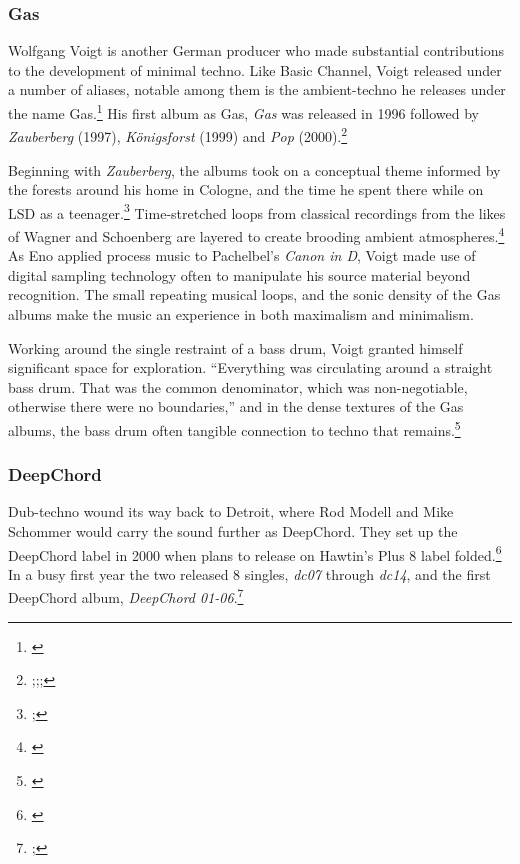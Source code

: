 \documentclass[12pt,twoside]{reedthesis}
\begin{document}
\subsubsection{Gas}
Wolfgang Voigt is another German producer who made substantial contributions to the development of minimal techno. Like Basic Channel, Voigt released under a number of aliases, notable among them is the ambient-techno he releases under the name Gas.\footnote{\cite{bacherWolfgangVoigt2018}} His first album as Gas, \emph{Gas} was released in 1996 followed by \emph{Zauberberg} (1997), \emph{K{\"o}nigsforst} (1999) and \emph{Pop} (2000).\footnote{\cite{gasGas1996};\cite{gasZauberberg1997};\cite{gasKonigsforst1999};\cite{gasPop2000}}

Beginning with \emph{Zauberberg}, the albums took on a conceptual theme informed by the forests around his home in Cologne, and the time he spent there while on LSD as a teenager.\footnote{\cite{mattfulkersonInterviewWolfgangVoigt2016};\cite{betaGasAmbientTechno2018}} Time-stretched loops from classical recordings from the likes of Wagner and Schoenberg are layered to create brooding ambient atmospheres.\footnote{\cite{betaGasAmbientTechno2018}} As Eno applied process music to Pachelbel's \emph{Canon in D}, Voigt made use of digital sampling technology often to manipulate his source material beyond recognition. The small repeating musical loops, and the sonic density of the Gas albums make the music an experience in both maximalism and minimalism.

Working around the single restraint of a bass drum, Voigt granted himself significant space for exploration. ``Everything was circulating around a straight bass drum. That was the common denominator, which was non-negotiable, otherwise there were no boundaries,'' and in the dense textures of the Gas albums, the bass drum often tangible connection to techno that remains.\footnote{\cite{bacherWolfgangVoigt2018}}

\subsubsection{DeepChord}
Dub-techno wound its way back to Detroit, where Rod Modell and Mike Schommer would carry the sound further as DeepChord. They set up the DeepChord label in 2000 when plans to release on Hawtin's Plus 8 label folded.\footnote{\cite{russellDeepChordDoesnCare2014}} In a busy first year the two released 8 singles, \emph{dc07} through \emph{dc14}, and the first DeepChord album, \emph{DeepChord 01-06}.\footnote{\cite{DeepChordDiscogs};\cite{deepchordDeepChord01062000}}
\end{document}
